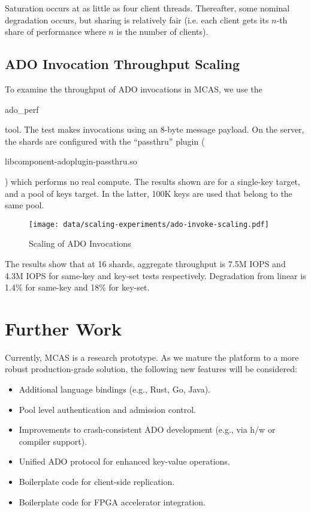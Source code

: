 \documentclass[letterpaper,twocolumn,10pt]{article}
\newcommand{\code}[1]{\begin{ttcodefont}#1\end{ttcodefont}}
\begin{document}
Saturation occurs at as little as four client threads.  Thereafter,
some nominal degradation occurs, but sharing is relatively fair
(i.e. each client gets its $n$-th share of performance where $n$ is
the number of clients).


\subsection{ADO Invocation Throughput Scaling}

To examine the throughput of ADO invocations in MCAS, we use the
\code{ado\_perf} tool. The test makes invocations using an 8-byte
message payload.  On the server, the shards are configured with the
``passthru'' plugin (\code{libcomponent-adoplugin-passthru.so}) which
performs no real compute.  The results shown are for a single-key
target, and a pool of keys target.  In the latter, 100K keys are used
that belong to the same pool.

\begin{figure}[ht!]
\centering
\texttt{[image: data/scaling-experiments/ado-invoke-scaling.pdf]}
\caption{Scaling of ADO Invocations}
\label{plot:adoscaling}
\end{figure}

The results show that at 16 shards, aggregate throughput is 7.5M IOPS
and 4.3M IOPS for same-key and key-set tests respectively.
Degradation from linear is 1.4\% for same-key and 18\% for key-set.


\section{Further Work}

Currently, MCAS is a research prototype. 
As we mature the platform to
a more robust production-grade solution, the following new features
will be considered:

\begin{itemize}
\item Additional language bindings (e.g., Rust, Go, Java).
\item Pool level authentication and admission control.
\item Improvements to crash-consistent ADO development (e.g., via h/w or compiler support).
\item Unified ADO protocol for enhanced key-value operations.
\item Boilerplate code for client-side replication.
\item Boilerplate code for FPGA accelerator integration.
\end{itemize}
\end{document}
